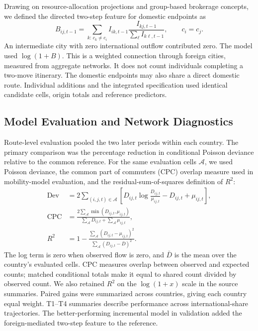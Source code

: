 Drawing on resource-allocation projections\cite{zhou2007} and group-based brokerage concepts\cite{gould1989}, we defined the directed two-step feature for domestic endpoints as
\begin{equation*}
B_{ij,t-1}=\sum_{k:\,c_k\ne c_i}
I_{ik,t-1}\frac{I_{kj,t-1}}{\sum_{\ell}I_{k\ell,t-1}},
\qquad c_i=c_j.
\end{equation*}
An intermediate city with zero international outflow contributed zero. The model used $\log(1+B)$. This is a weighted connection through foreign cities, measured from aggregate networks. It does not count individuals completing a two-move itinerary. The domestic endpoints may also share a direct domestic route. Individual additions and the integrated specification used identical candidate cells, origin totals and reference predictors.

\subsection{Model Evaluation and Network Diagnostics}
\label{supp:model_evaluation}

Route-level evaluation pooled the two later periods within each country. The primary comparison was the percentage reduction in conditional Poisson deviance relative to the common reference. For the same evaluation cells $\mathcal{A}$, we used Poisson deviance\cite{nelder1972}, the common part of commuters (CPC) overlap measure used in mobility-model evaluation\cite{lenormand2016}, and the residual-sum-of-squares definition of $R^2$\cite{kvalseth1985}:
\begin{align*}
\mathrm{Dev}&=2\sum_{(i,j,t)\in\mathcal{A}}
\left[D_{ij,t}\log\frac{D_{ij,t}}{\mu_{ij,t}}-D_{ij,t}+\mu_{ij,t}\right],\\
\mathrm{CPC}&=\frac{2\sum_{\mathcal{A}}\min(D_{ij,t},\mu_{ij,t})}
{\sum_{\mathcal{A}}D_{ij,t}+\sum_{\mathcal{A}}\mu_{ij,t}},\\
R^2&=1-\frac{\sum_{\mathcal{A}}(D_{ij,t}-\mu_{ij,t})^2}
{\sum_{\mathcal{A}}(D_{ij,t}-\bar{D})^2}.
\end{align*}
The log term is zero when observed flow is zero, and $\bar{D}$ is the mean over the country's evaluated cells. CPC measures overlap between observed and expected counts; matched conditional totals make it equal to shared count divided by observed count. We also retained $R^2$ on the $\log(1+x)$ scale in the source summaries. Paired gains were summarized across countries, giving each country equal weight. T1--T4 summaries describe performance across international-share trajectories. The better-performing incremental model in validation added the foreign-mediated two-step feature to the reference.

